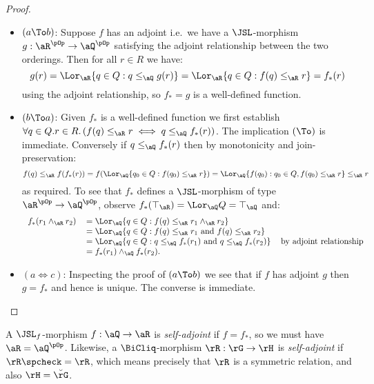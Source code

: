 \documentclass{article}
\begin{document}
\begin{proof}
\item
\begin{itemize}
\item
$(a \To b)$: Suppose $f$ has an adjoint i.e.\ we have a $\JSL$-morphism $g : \aR^{\pOp} \to \aQ^{\pOp}$ satisfying the adjoint relationship between the two orderings. Then for all $r \in R$ we have:
\[
g(r) 
= \Lor_\aR \{ q \in Q : q \leq_\aQ g(r) \}
= \Lor_\aR \{ q \in Q : f(q) \leq_\aR r \}
= f_*(r)
\]
using the adjoint relationship, so $f_* = g$ is a well-defined function.

\item
$(b \To a)$: Given $f_*$ is a well-defined function we first  establish  $\forall q \in Q. r \in R.\,(f(q) \leq_\aR r \iff q \leq_\aQ f_*(r))$. The implication $(\To)$ is immediate. Conversely if $q \leq_\aQ f_*(r)$ then by monotonicity and join-preservation:
\[
f(q) \leq_\aR f(f_*(r)) 
= f(\Lor_\aQ \{ q_0 \in Q : f(q_0) \leq_\aR r \})
= \Lor_\aQ \{ f(q_0) : q_0 \in Q, f(q_0) \leq_\aR r  \}
\leq_\aR r
\]
as required. To see that $f_*$ defines a $\JSL$-morphism of type $\aR^{\pOp} \to \aQ^{\pOp}$, observe $f_*(\top_\aR) = \Lor_\aQ Q = \top_\aQ$ and:
\[
\begin{tabular}{lll}
$f_*(r_1 \land_\aR r_2)$
&
$= \Lor_\aQ \{ q \in Q : f(q) \leq_\aR r_1 \land_\aR r_2 \}$
\\&
$= \Lor_\aQ \{ q \in Q : f(q) \leq_\aR r_1 \text{ and } f(q) \leq_\aR r_2 \}$
\\&
$= \Lor_\aQ \{ q \in Q : q \leq_\aQ f_*(r_1) \text{ and } q \leq_\aQ f_*(r_2) \}$
& by adjoint relationship
\\&
$= f_*(r_1) \land_\aQ f_*(r_2)$.
\end{tabular}
\]

\item
$(a \iff c)$: Inspecting the proof of $(a \To b)$ we see that if $f$ has adjoint $g$ then $g = f_*$ and hence is unique. The converse is immediate.
 \end{itemize}
\end{proof}

\smallskip

\begin{definition}
\item
A $\JSL_f$-morphism $f : \aQ \to \aR$ is \emph{self-adjoint} if $f = f_*$, so we must have $\aR = \aQ^{\pOp}$. Likewise, a $\BiCliq$-morphism $\rR : \rG \to \rH$ is \emph{self-adjoint} if $\rR\spcheck = \rR$, which means precisely that $\rR$ is a symmetric relation, and also $\rH = \breve{\rG}$. \endbox
\end{definition}
\end{document}

